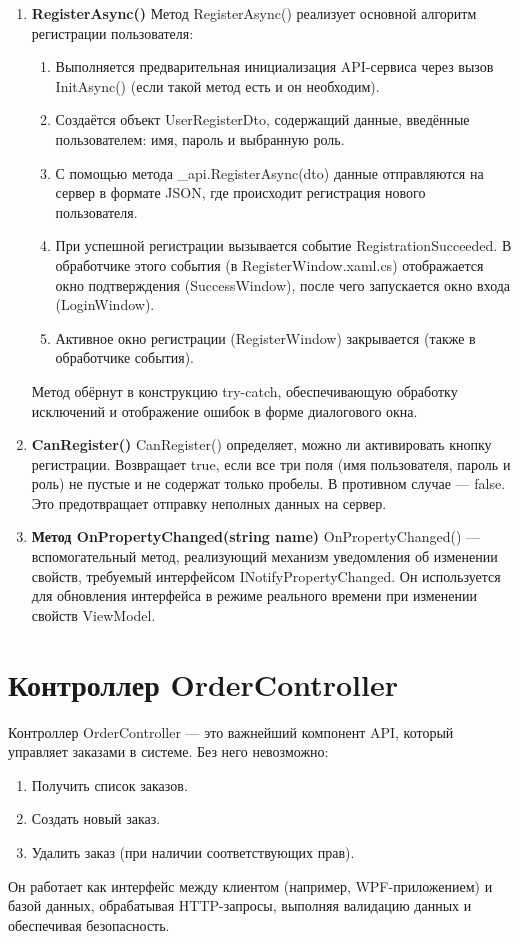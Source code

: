 \documentclass[12pt]{article}
\renewcommand{\texttt}[1]{{\small\ttfamily #1}}
\numberwithin{listing}{section}
\numberwithin{figure}{section}
\begin{document}
\begin{enumerate}
	\item \textbf{\texttt{RegisterAsync()}}
	      Метод \texttt{RegisterAsync()} реализует основной алгоритм регистрации пользователя:
	      \begin{enumerate}
		      \item Выполняется предварительная инициализация API-сервиса через вызов \texttt{InitAsync()} (если такой метод есть и он необходим).
		      \item Создаётся объект \texttt{UserRegisterDto}, содержащий данные, введённые пользователем: имя, пароль и выбранную роль.
		      \item С помощью метода \texttt{\_api.RegisterAsync(dto)} данные отправляются на сервер в формате JSON, где происходит регистрация нового пользователя.
		      \item При успешной регистрации вызывается событие \texttt{RegistrationSucceeded}. В обработчике этого события (в \texttt{RegisterWindow.xaml.cs}) отображается окно подтверждения (\texttt{Success\-Window}), после чего запускается окно входа (\texttt{LoginWindow}).
		      \item Активное окно регистрации (\texttt{RegisterWindow}) закрывается (также в обработчике события).
	      \end{enumerate}
	      Метод обёрнут в конструкцию \texttt{try-catch}, обеспечивающую обработку исключений и отображение ошибок в форме диалогового окна.

	\item \textbf{\texttt{CanRegister()}}
	      \texttt{CanRegister()} определяет, можно ли активировать кнопку регистрации. Возвращает \texttt{true}, если все три поля (имя пользователя, пароль и роль) не пустые и не содержат только пробелы. В противном случае — \texttt{false}. Это предотвращает отправку неполных данных на сервер.

	\item \textbf{Метод \texttt{OnPropertyChanged(string name)}}
	      \texttt{OnPropertyChanged()} — вспомогательный метод, реализующий механизм уведомления об изменении свойств, требуемый интерфейсом \texttt{INotify\-Property\-Changed}. Он используется для обновления интерфейса в режиме реального времени при изменении свойств ViewModel.
\end{enumerate}

\section{Контроллер OrderController}
Контроллер \texttt{OrderController} — это важнейший компонент API, который управляет заказами в системе. Без него невозможно:
\begin{enumerate}
	\item Получить список заказов.
	\item Создать новый заказ.
	\item Удалить заказ (при наличии соответствующих прав).
\end{enumerate}
Он работает как интерфейс между клиентом (например, WPF-приложением) и базой данных, обрабатывая HTTP-запросы, выполняя валидацию данных и обеспечивая безопасность.
\end{document}
